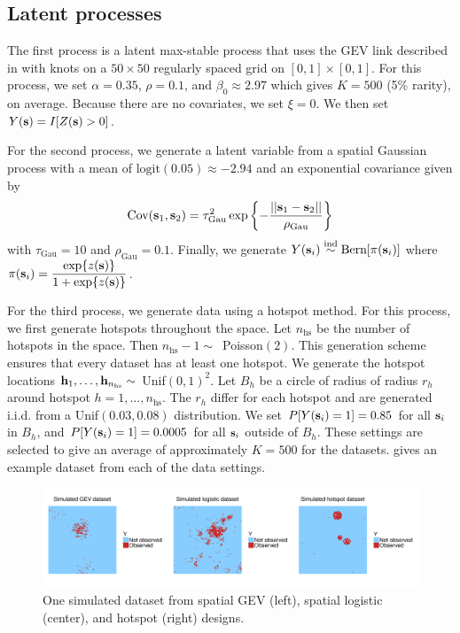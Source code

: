 \subsection{Latent processes} \label{rbs:simsettings}

The first process is a latent max-stable process that uses the GEV link described in  with knots on a $50 \times 50$ regularly spaced grid on $[0, 1] \times [0, 1]$.
For this process, we set $\alpha = 0.35$, $\rho = 0.1$, and $\beta_0 \approx 2.97$ which gives $K = 500$ (5\% rarity), on average.
Because there are no covariates, we set $\xi = 0$.
We then set $Y(\mathbf{s}) = I[Z(\mathbf{s}) > 0]$.

For the second process, we generate a latent variable from a spatial Gaussian process with a mean of $\text{logit}(0.05) \approx -2.94$ and an exponential covariance given by
\begin{align}
\text{Cov}(\mathbf{s}_1, \mathbf{s}_2) = \tau_\text{Gau}^2 \exp\left\{- \frac{||\mathbf{s}_1 - \mathbf{s}_2||}{\rho_\text{Gau}}\right\}
\end{align}
with $\tau_\text{Gau} = 10$ and $\rho_\text{Gau} = 0.1$.
Finally, we generate $Y(\mathbf{s}_i) \stackrel{\mathrm{ind}}{\sim} \text{Bern}[\pi(\mathbf{s}_i)]$
where $\pi(\mathbf{s}_i) = \displaystyle \frac{ \exp\{z(\mathbf{s})\}}{1 + \exp\{z(\mathbf{s})\} }$.

For the third process, we generate data using a hotspot method.
For this process, we first generate hotspots throughout the space.
Let $n_\text{hs}$ be the number of hotspots in the space.
Then \mbox{$n_\text{hs} - 1 \sim$ Poisson$(2)$}.
This generation scheme ensures that every dataset has at least one hotspot.
We generate the hotspot locations $\mathbf{h}_1, \ldots, \mathbf{h}_{n_\text{hs}} \sim$ Unif$(0, 1)^2$.
Let $B_h$ be a circle of radius of radius $r_h$ around hotspot $h = 1, \ldots, n_\text{hs}$.
The $r_h$ differ for each hotspot and are generated i.i.d. from a Unif$(0.03, 0.08)$ distribution.
We set $P[Y(\mathbf{s}_i) = 1] = 0.85$ for all $\mathbf{s}_i$ in $B_h$, and $P[Y(\mathbf{s}_i) = 1] = 0.0005$ for all $\mathbf{s}_i$ outside of $B_h$.
These settings are selected to give an average of approximately $K = 500$ for the datasets.
 gives an example dataset from each of the data settings.

\begin{figure}  %
	\centering
	\includegraphics[width=\linewidth, trim={0em, 1em, 0em, 1em}]{plots/simulateddata}
	\caption{One simulated dataset from spatial GEV (left), spatial logistic (center), and hotspot (right) designs.}
	\label{rbfig:simulateddata}
\end{figure}

